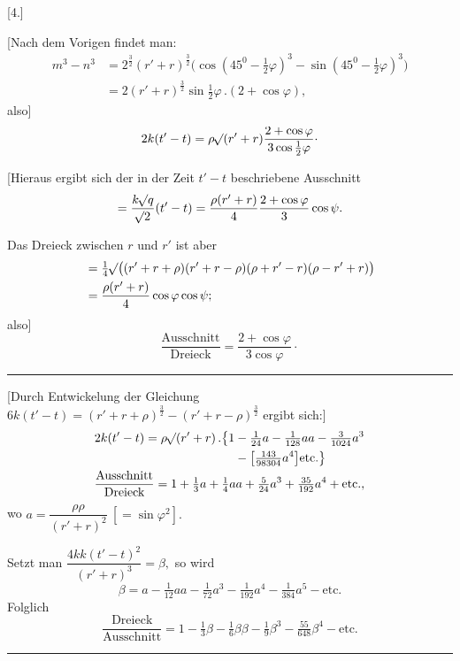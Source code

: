 \clearpage
{}
\begin{center}
[4.]\par
{}
\end{center}

[Nach dem Vorigen findet man:
\[
\begin{aligned}
m^3-n^3&=2^{\frac32}(r'+r)^{\frac32}\bigl(\cos(45^0-\tfrac12\varphi)^3-\sin(45^0-\tfrac12\varphi)^3\bigr)\\
&=2(r'+r)^{\frac32}\sin\tfrac12\varphi\,.(2+\cos\varphi),
\end{aligned}
\]
also]
\[
2k(t'-t)=\rho\mathord{{}^{}\!\surd}(r'+r)\frac{2+\cos\varphi}{3\cos\tfrac12\varphi}\mathpunct{\cdot}
\]

[Hieraus ergibt sich der in der Zeit \(t'-t\) beschriebene Ausschnitt
\[
=\frac{k\mathord{{}^{}\!\surd}q}{\mathord{{}^{}\!\surd}2}(t'-t)=\frac{\rho(r'+r)}4\frac{2+\cos\varphi}3\cos\psi.
\]

Das Dreieck zwischen \(r\) und \(r'\) ist aber
\[
\begin{aligned}
&=\tfrac14\mathord{{}^{}\!\surd}\bigl((r'+r+\rho)(r'+r-\rho)(\rho+r'-r)(\rho-r'+r)\bigr)\\
&=\frac{\rho(r'+r)}4\cos\varphi\cos\psi;
\end{aligned}
\]
also]
\[
\frac{\mathrm{Ausschnitt}}{\mathrm{Dreieck}}=\frac{2+\cos\varphi}{3\cos\varphi}\mathpunct{\cdot}
\]
\begin{center}\rule{.3\linewidth}{.4pt}\end{center}

[Durch Entwickelung der Gleichung \(6k(t'-t)=(r'+r+\rho)^{\frac32}-(r'+r-\rho)^{\frac32}\) ergibt sich:]
\[
\begin{gathered}
\begin{aligned}
2k(t'-t)=\rho\mathord{{}^{}\!\surd}(r'+r)\,.\bigl\{1&-\tfrac1{24}a-\tfrac1{128}aa-\tfrac3{1024}a^3\\
&-\bigl[\tfrac{143}{98304}a^4\bigr]\mathrm{etc.}\bigr\}
\end{aligned}\\
\frac{\mathrm{Ausschnitt}}{\mathrm{Dreieck}}=1+\tfrac13a+\tfrac14aa+\tfrac5{24}a^3+\tfrac{35}{192}a^4+\mathrm{etc.},
\end{gathered}
\]
wo \(a=\dfrac{\rho\rho}{(r'+r)^2}\ [=\sin\varphi^2].\)

Setzt man \(\dfrac{4kk(t'-t)^2}{(r'+r)^3}=\beta,\) so wird
\[
\beta=a-\tfrac1{12}aa-\tfrac1{72}a^3-\tfrac1{192}a^4-\tfrac1{384}a^5-\mathrm{etc.}
\]
Folglich
\[
\frac{\mathrm{Dreieck}}{\mathrm{Ausschnitt}}=1-\tfrac13\beta-\tfrac16\beta\beta-\tfrac19\beta^3-\tfrac{55}{648}\beta^4-\mathrm{etc.}
\]
\begin{center}\rule{.3\linewidth}{.4pt}\end{center}

